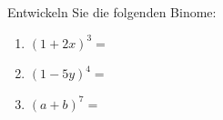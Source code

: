 \begin{ExerciseBlock}
Entwickeln Sie die folgenden Binome:
\begin{enumerate}[label=\alph*)]
\item $\displaystyle (1+2x)^3 =$
\item $\displaystyle (1-5y)^4 =$
\item $\displaystyle \left(a+b\right)^7 =$
\end{enumerate}

\end{ExerciseBlock}
